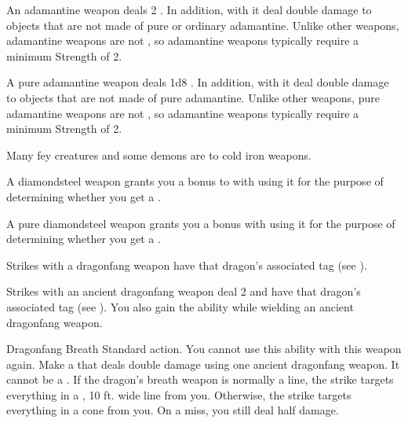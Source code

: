        An adamantine weapon deals 2 .
      In addition,  with it deal double damage to objects that are not made of pure or ordinary adamantine.
      Unlike other weapons, adamantine weapons are not , so  adamantine weapons typically require a minimum Strength of 2.

       A pure adamantine weapon deals 1d8 .
      In addition,  with it deal double damage to objects that are not made of pure adamantine.
      Unlike other weapons, pure adamantine weapons are not , so  adamantine weapons typically require a minimum Strength of 2.

       Many fey creatures and some demons are \vulnerable to cold iron weapons.

       A diamondsteel weapon grants you a  bonus to  with  using it for the purpose of determining whether you get a .

       A pure diamondsteel weapon grants you a   bonus with  using it for the purpose of determining whether you get a .

       Strikes with a dragonfang weapon have that dragon's associated tag (see ).

       Strikes with an ancient dragonfang weapon deal 2  and have that dragon's associated tag (see ).
      You also gain the  ability while wielding an ancient dragonfang weapon.
      \begin{activeability}{Dragonfang Breath}
        \abilityusagetime Standard action.
        \abilitycost You  cannot use this ability with this weapon again.
        \rankline
        Make a  that deals double damage using one ancient dragonfang weapon.
        It cannot be a .
        If the dragon's breath weapon is normally a line, the strike targets everything in a \arealarge, 10 ft. wide line from you.
        Otherwise, the strike targets everything in a \areamed cone from you.
        On a miss, you still deal half damage.
      \end{activeability}

